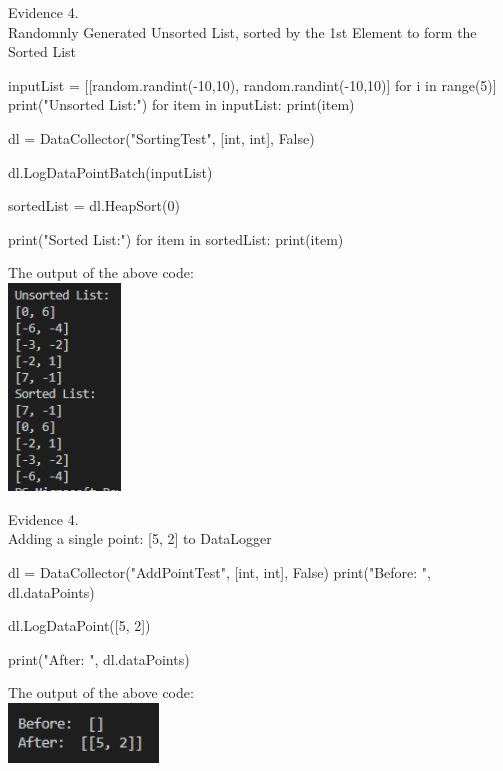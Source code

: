 \setcounter{magicrownumbers}{0}
\begin{center}
    {\large Evidence 4.\rn } \\ 
    \vspace{0.3cm}
    Randomnly Generated Unsorted List, sorted by the 1st Element to form the Sorted List \\

    \begin{pythoncode}
inputList = [[random.randint(-10,10), random.randint(-10,10)] for i in range(5)]
print("Unsorted List:")
for item in inputList:
print(item)

dl = DataCollector("SortingTest", [int, int], False)

dl.LogDataPointBatch(inputList)

sortedList = dl.HeapSort(0)

print("Sorted List:")
for item in sortedList:
print(item)
    \end{pythoncode}

    The output of the above code: \\
    \includegraphics[width=3cm]{Images/Testing/T4.1.1.PNG} \\

    \vspace{1cm}

    {\large Evidence 4.\rn } \\ 
    \vspace{0.3cm}
    Adding a single point: [5, 2] to DataLogger \\
    \begin{pythoncode}
dl = DataCollector("AddPointTest", [int, int], False)
print("Before: ", dl.dataPoints)

dl.LogDataPoint([5, 2])

print("After: ", dl.dataPoints)
    \end{pythoncode}

    The output of the above code: \\
    \includegraphics[width=4cm]{Images/Testing/T4.2.1.PNG} \\
    \vspace{1cm}


\end{center}
